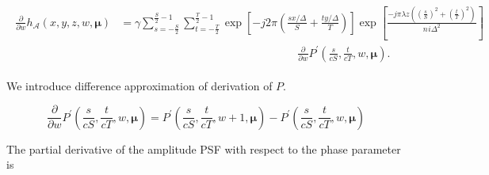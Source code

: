 \documentclass[letter, 11pt]{article}
\begin{document}
\begin{align*}
\begin{split}
	\end{split} \\
	\begin{split}
		\frac{\partial}{\partial w} h_{\mathcal{A}} (x, y, z, w, \boldsymbol{\mu}) &=
		\gamma \sum\limits_{s = - \frac{S}{2} }^{\frac{S}{2} - 1} \sum\limits_{t = - \frac{T}{2} }^{\frac{T}{2} - 1} 
		\exp \left[ - j 2 \pi \left( \frac{s x / \Delta}{S} + 
		\frac{t y / \Delta }{T} \right) \right] 
		\exp \left[ \frac{- j \pi \lambda z ( { \left( \frac{s}{S} \right) }^{2} + 		
		{\left( \frac{t}{T} \right)}^{2} ) }{ n_{}i \Delta^{2} } \right]  \\
		&\qquad \qquad \qquad \qquad \qquad \qquad \qquad \qquad 
		\frac{\partial}{\partial w} P^{\prime} {\left( \frac{s}{cS}, \frac{t}{cT}, w, \boldsymbol{\mu} \right)}.
	\end{split}
\end{align*}


\noindent
We introduce difference approximation of derivation of $P$.

\begin{equation*}
	\frac{\partial}{\partial w} P^{\prime} {\left( \frac{s}{cS}, \frac{t}{cT}, w, \boldsymbol{\mu} \right)}
	= P^{\prime} {\left( \frac{s}{cS}, \frac{t}{cT}, w+1, \boldsymbol{\mu} \right)} -
	P^{\prime} {\left( \frac{s}{cS}, \frac{t}{cT}, w, \boldsymbol{\mu} \right)}
\end{equation*}


The partial derivative of the amplitude PSF with respect to the phase parameter is
\end{document}
